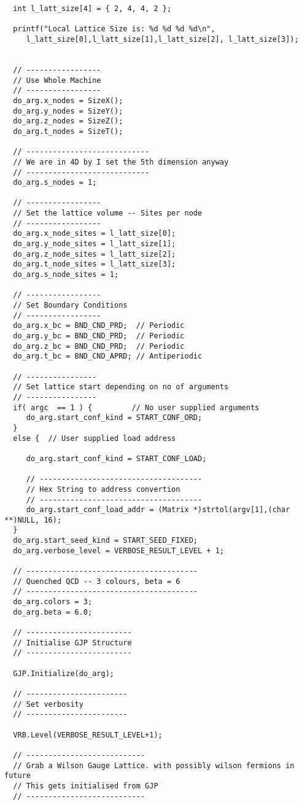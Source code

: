 {\begin{verbatim}
  int l_latt_size[4] = { 2, 4, 4, 2 };

  printf("Local Lattice Size is: %d %d %d %d\n", 
	 l_latt_size[0],l_latt_size[1],l_latt_size[2], l_latt_size[3]);
  

  // -----------------
  // Use Whole Machine
  // -----------------
  do_arg.x_nodes = SizeX();
  do_arg.y_nodes = SizeY();
  do_arg.z_nodes = SizeZ();
  do_arg.t_nodes = SizeT();

  // ----------------------------
  // We are in 4D by I set the 5th dimension anyway
  // ----------------------------
  do_arg.s_nodes = 1;

  // -----------------
  // Set the lattice volume -- Sites per node
  // -----------------
  do_arg.x_node_sites = l_latt_size[0];
  do_arg.y_node_sites = l_latt_size[1];
  do_arg.z_node_sites = l_latt_size[2];
  do_arg.t_node_sites = l_latt_size[3];
  do_arg.s_node_sites = 1;

  // -----------------
  // Set Boundary Conditions
  // -----------------
  do_arg.x_bc = BND_CND_PRD;  // Periodic
  do_arg.y_bc = BND_CND_PRD;  // Periodic
  do_arg.z_bc = BND_CND_PRD;  // Periodic
  do_arg.t_bc = BND_CND_APRD; // Antiperiodic

  // ----------------
  // Set lattice start depending on no of arguments
  // ----------------
  if( argc  == 1 ) {         // No user supplied arguments
     do_arg.start_conf_kind = START_CONF_ORD;
  }
  else {  // User supplied load address
     
     do_arg.start_conf_kind = START_CONF_LOAD;

     // -------------------------------------
     // Hex String to address convertion
     // -------------------------------------
     do_arg.start_conf_load_addr = (Matrix *)strtol(argv[1],(char **)NULL, 16);
  }
  do_arg.start_seed_kind = START_SEED_FIXED;
  do_arg.verbose_level = VERBOSE_RESULT_LEVEL + 1;

  // ---------------------------------------
  // Quenched QCD -- 3 colours, beta = 6
  // --------------------------------------- 
  do_arg.colors = 3;
  do_arg.beta = 6.0;

  // ------------------------
  // Initialise GJP Structure
  // ------------------------

  GJP.Initialize(do_arg);
  
  // -----------------------
  // Set verbosity
  // -----------------------

  VRB.Level(VERBOSE_RESULT_LEVEL+1);

  // ---------------------------
  // Grab a Wilson Gauge Lattice. with possibly wilson fermions in future
  // This gets initialised from GJP
  // ---------------------------


\end{verbatim}}
